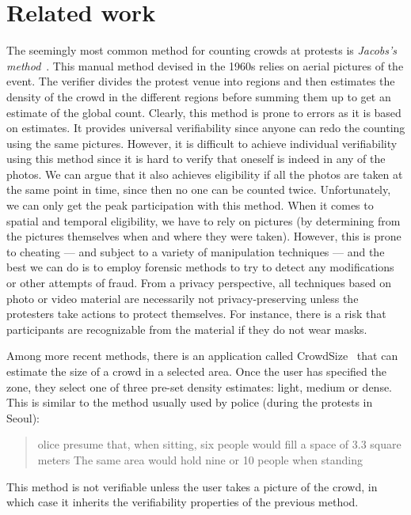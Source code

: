 \section{Related work}%
\label{related-work}



The seemingly most common method for counting crowds at protests is \emph{Jacobs's method}~\cite{2016DemonstrationsInSeoul,BBCHowToCountProtestNumbers,HowWillWeKnowTrumpInauguralCrowdSize,TheXManMarch,TheCrowdNumbersGame}.
This manual method devised in the 1960s relies on aerial pictures of the event.
The verifier divides the protest venue into regions and then estimates the density of the crowd in the different regions before summing them up to get an estimate of the global count.
Clearly, this method is prone to errors as it is based on estimates.
It provides universal verifiability since anyone can redo the counting using the same pictures.
However, it is difficult to achieve individual verifiability using this method since it is hard to verify that oneself is indeed in any of the photos. %
We can argue that it also achieves eligibility if all the photos are taken at the same point in time, since then no one can be counted twice.
Unfortunately, we can only get the peak participation with this method.
When it comes to spatial and temporal eligibility, we have to rely on pictures (\eg by determining from the pictures themselves when and where they were taken).
However, this is prone to cheating --- and subject to a variety of manipulation techniques --- and the best we can do is to employ forensic methods to try to detect any modifications or other attempts of fraud.
From a privacy perspective, all techniques based on photo or video material are necessarily not privacy-preserving unless the protesters take actions to protect themselves.
For instance, there is a risk that participants are recognizable from the material if they do not wear masks.

Among more recent methods, there is an application called CrowdSize~\cite{CrowdSize} that can estimate the size of a crowd in a selected area.
Once the user has specified the zone, they select one of three pre-set density estimates: light, medium or dense.
This is similar to the method usually used by police (\eg during the protests in Seoul):
\blockcquote{2016DemonstrationsInSeoul}{%
  olice presume that, when sitting, six people would fill a space of 3.3 square meters
  \textelp{}
  The same area would hold nine or 10 people when standing%
}.
This method is not verifiable unless the user takes a picture of the crowd, in which case it inherits the verifiability properties of the previous method.

